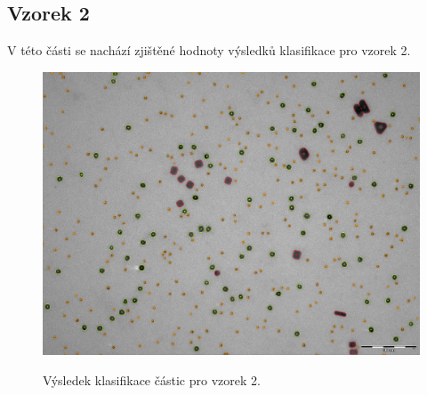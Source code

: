 \documentclass[11pt,twoside,a4paper,table]{book}
\begin{document}
\subsection{Vzorek 2}
V této části se nachází zjištěné hodnoty výsledků klasifikace pro vzorek 2.
\begin{figure}[h!]
\center
\includegraphics[width=\textwidth]{figures/multi2_klasifikace.png}
\label{fig:class1}
\caption{Výsledek klasifikace částic pro vzorek 2.}
\end{figure}
\end{document}

